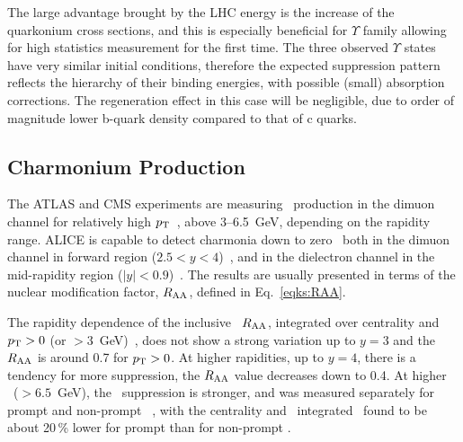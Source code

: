 The large advantage brought by the LHC energy is the increase of the quarkonium cross sections, and this is especially beneficial for $\Upsilon$ family allowing for high statistics measurement for the first time. The three observed $\Upsilon$ states have very similar initial conditions, therefore the expected suppression pattern reflects the hierarchy of their binding energies, with possible (small) absorption corrections. The regeneration effect in this case will be negligible, due to order of magnitude lower b-quark density compared to that of c quarks.

\subsection{Charmonium Production}

The ATLAS and CMS experiments are measuring \Jpsi\ production in the dimuon channel for relatively high $p_{\rm T}$~\cite{Aad:2010aa,Chatrchyan:2012np}, above 3--6.5~GeV, depending on the rapidity range. ALICE is capable to detect charmonia down to zero \pT\ both in the dimuon channel in forward region ($2.5 < y < 4$)~\cite{Abelev:2012rv}, and in the dielectron channel in the mid-rapidity region ($|y| < 0.9$)~\cite{Abelev:2013ila}. The results are usually presented in terms of the nuclear modification factor, $R_{\rm AA}$, defined in Eq.~\ref{eqks:RAA}.

The rapidity dependence of the inclusive \Jpsi\ $R_{\rm AA}$, integrated over centrality and $p_{\rm T} > 0$ (or $> 3$~GeV)~\cite{Abelev:2012rv,Abelev:2013ila}, does not show a strong variation up to $y = 3$ and the $R_{\rm AA}$ is around 0.7 for $p_{\rm T} > 0$. At higher rapidities, up to $y = 4$, there is a tendency for more suppression, the $R_{\rm AA}$ value decreases down to 0.4. At higher \pT\ ($> 6.5$~GeV), the \Jpsi\ suppression is stronger, and was measured separately for prompt and non-prompt \Jpsi~\cite{Chatrchyan:2012np,CMS:2012wba}, with the centrality and \pT\ integrated \Raa\ found to be about 20\,\% lower for prompt than for non-prompt \Jpsi.

